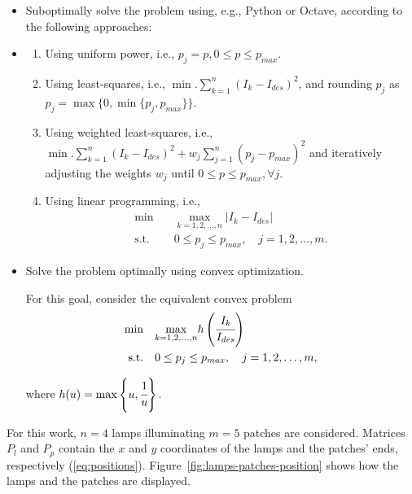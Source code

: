 \documentclass[11pt,a4paper]{article}
\begin{document}
\begin{itemize}
    \item[] Suboptimally solve the problem using, e.g., Python or Octave, according to the following approaches:
    \item[] \begin{enumerate}
        \item Using uniform power, i.e., $p_j = p, 0 \leq p \leq p_{max}$.
        \item Using least-squares, i.e., $\min . \displaystyle \sum_{k=1}^{n} (I_k - I_{des})^2$, and rounding $p_j$ as $p_j = \max\{0, \min\{p_j, p_{max}\}\}$.
        \item Using weighted least-squares, i.e., $\min . \displaystyle \sum_{k=1}^{n}(I_k - I_{des})^2 + w_j\sum_{j=1}^n (p_j - p_{max})^2$ and iteratively adjusting the weights $w_j$ until $0 \leq p \leq p_{max}, \forall j$.
        \item Using linear programming, i.e., 
        \begin{align*}
            \min & \quad \underset{k=1, 2, \dots, n}{\max} \vert I_{k} - I_{des} \vert \\
            \text{s.t.} & \quad 0 \leq p_j \leq p_{max}, \quad j = 1, 2, \dots, m.
        \end{align*}
    \end{enumerate}
    \item[] Solve the problem optimally using convex optimization.
        
        For this goal, consider the equivalent convex problem
        \begin{align*}
            \min & \quad \underset{k = 1, 2, \dots, n}{\max} h\left(\cfrac{I_k}{I_{des}}\right) \\
            \text{s.t.} & \quad 0 \leq p_j \leq p_{max}, \quad j = 1, 2, \dots, m, 
        \end{align*}
    
        where $h(u) = \max\left\{u, \cfrac{1}{u}\right\}$.
\end{itemize}

For this work, $n = 4$ lamps illuminating $m = 5$ patches are considered. Matrices $P_l$ and $P_{p}$ contain the $x$ and $y$ coordinates of the lamps and the patches' ends, respectively (\ref{eq:positions}). Figure~\ref{fig:lamps-patches-position} shows how the lamps and the patches are displayed. 
\end{document}
